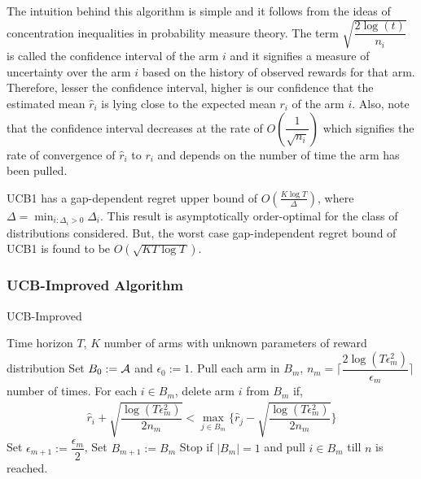     The intuition behind this algorithm is simple and it follows from the ideas of concentration inequalities in probability measure theory. The term $\sqrt{\dfrac{2\log (t)}{n_i}}$ is called the confidence interval of the arm $i$ and it signifies a measure of uncertainty over the arm $i$ based on the history of observed rewards for that arm. Therefore, lesser the confidence interval, higher is our confidence that the estimated mean $\hat{r}_i$ is lying close to the expected mean $r_i$ of the arm $i$. Also, note that the confidence interval decreases at the rate of $O\left( \dfrac{1}{\sqrt{n_i}}\right)$ which signifies the rate of convergence of $\hat{r}_i$ to $r_i$ and depends on the number of time the arm has been pulled.
    
    UCB1 has a gap-dependent regret upper bound of  $O\left(\frac{K\log T}{\Delta}\right)$, where $\Delta = \min_{i:\Delta_i>0} \Delta_i$. This result is asymptotically order-optimal for the class of distributions considered. But, the worst case gap-independent regret bound of UCB1 is found to be  $O \left(\sqrt{KT\log T}\right)$. 
    
\subsubsection{UCB-Improved Algorithm}        
    
\begin{algorithm}[!th]
\caption{UCB-Improved}
\label{alg:ucbi}
\begin{algorithmic}[1]
 Time horizon $T$, $K$ number of arms with unknown parameters of reward distribution
 Set $B_{0}:= \mathcal{A}$ and $\epsilon_{0}:=1$.
\State Pull each arm in $B_m$, $n_{m}=\bigg\lceil\dfrac{2\log{( T\epsilon_{m}^{2})}}{\epsilon_{m}}\bigg\rceil$ number of times.
\ArmElim
\State For each $i \in B_{m}$, delete arm ${i}$ from $B_{m}$ if,
\begin{align*}
\hat{r}_{i} + \sqrt{\dfrac{\log{(T\epsilon_{m}^{2})}}{2 n_{m}}}  < \max_{{j}\in B_{m}}\bigg\lbrace\hat{r}_{j} -\sqrt{\dfrac{\log{( T\epsilon_{m}^{2})}}{2 n_{m}}} \bigg\rbrace
\end{align*}
\EndArmElim
\State Set $\epsilon_{m+1}:=\dfrac{\epsilon_{m}}{2}$, Set $B_{m+1}:=B_{m}$
\State Stop if $|B_{m}|=1$ and pull ${i}\in B_{m}$ till $n$ is reached.
\EndFor
\end{algorithmic}
\end{algorithm}
    
